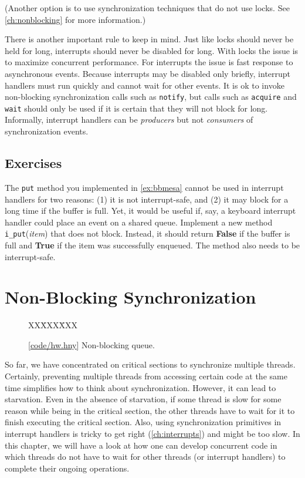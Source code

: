 \documentclass{report}
\newcommand{\harmonysource}[1]{
\begin{tabbing}
XX\=XXX\=XXX\kill
    
\end{tabbing}
}
\newcommand{\harmonylink}[1]{%
[\href{https://harmony.cs.cornell.edu/#1}{\underline{#1}}]%
}
\newenvironment{code}{
\tcolorbox
}{
\endtcolorbox
}
\begin{document}
(Another option is to use synchronization techniques that do not use locks.
See \autoref{ch:nonblocking} for more information.)

There is another important rule to keep in mind.  Just like locks should never be held
for long, interrupts should never be disabled for long.  With locks the issue is to
maximize concurrent performance.  For interrupts the issue is fast response to
asynchronous events.  Because interrupts may be disabled only briefly, interrupt
handlers must run quickly and cannot wait for other events.  It is ok to invoke
non-blocking synchronization calls such as \texttt{notify}, but calls such as
\texttt{acquire} and \texttt{wait} should only be used if it is certain that they will not
block for long.  Informally, interrupt handlers can be
\emph{producers} but not \emph{consumers} of synchronization events.

\section*{Exercises}
\begin{problems}
\item The \texttt{put} method you implemented in \autoref{ex:bbmesa} cannot be used
in interrupt handlers for two reasons: (1) it is not interrupt-safe, and (2)
it may block for a long time if the buffer is full.  Yet, it would be useful if,
say, a keyboard interrupt handler could place an event on a shared queue.
Implement a new method \texttt{i\_put}(\textit{item}) that does not
block.  Instead, it should return \textbf{False} if the buffer is full and \textbf{True}
if the item was successfully enqueued.
The method also needs to be interrupt-safe.
\end{problems}

\chapter{Non-Blocking Synchronization}
\label{ch:nonblocking}
%

%

\begin{figure}
\begin{code}
\harmonysource{hw}
\end{code}
\caption{\harmonylink{code/hw.hny} Non-blocking queue.}
\label{fig:hw}
\end{figure}

So far, we have concentrated on critical sections to synchronize multiple
threads.  Certainly, preventing multiple threads from accessing
certain code at the same time simplifies how to think about synchronization.
However, it can lead to starvation.  Even in the absence of starvation,
if some thread is slow for some reason while being in the critical section,
the other threads have to wait for it to finish executing the critical section.
Also, using synchronization primitives in interrupt handlers is tricky
to get right (\autoref{ch:interrupts}) and might be too slow.
In this chapter, we will have a look at how one can develop concurrent
code in which threads do not have to wait for other threads (or interrupt
handlers) to complete their ongoing operations.
\end{document}
